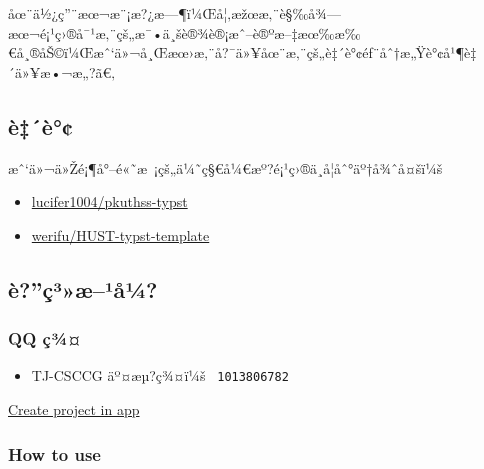 åœ¨ä½¿ç''¨æœ¬æ¨¡æ?¿æ---¶ï¼Œå¦‚æžœæ‚¨è§‰å¾---æœ¬é¡¹ç›®å¯¹æ‚¨çš„æ¯•ä¸šè®¾è®¡æˆ--è®ºæ--‡æœ‰æ‰€å¸®åŠ©ï¼Œæˆ`ä»¬å¸Œæœ›æ‚¨å?¯ä»¥åœ¨æ‚¨çš„è‡´è°¢éƒ¨åˆ†æ„Ÿè°¢å¹¶è‡´ä»¥æ•¬æ„?ã€‚

\subsection{è‡´è°¢}\label{uxe8uxe8}

æˆ`ä»¬ä»Žé¡¶å°--é«˜æ~¡çš„ä¼˜ç§€å¼€æº?é¡¹ç›®ä¸­å­¦åˆ°äº†å¾ˆå¤šï¼š

\begin{itemize}
\tightlist
\item
  \href{https://github.com/lucifer1004/pkuthss-typst}{lucifer1004/pkuthss-typst}
\item
  \href{https://github.com/werifu/HUST-typst-template}{werifu/HUST-typst-template}
\end{itemize}

\subsection{è?''ç³»æ--¹å¼?}\label{uxe8uxe7uxb3uxe6uxb9uxe5uxbc}

\begin{Shaded}
\begin{Highlighting}[]
\NormalTok{[}
    \StringTok{\textquotesingle{}$\textquotesingle{}}\NormalTok{, }\StringTok{\textquotesingle{}\%\textquotesingle{}}\NormalTok{, }\NormalTok{),}
\NormalTok{]}
\end{Highlighting}
\end{Shaded}

\subsubsection{QQ ç¾¤}\label{qq-uxe7uxbe}

\begin{itemize}
\tightlist
\item
  TJ-CSCCG äº¤æµ?ç¾¤ï¼š \texttt{\ 1013806782\ }
\end{itemize}

\href{/app?template=paddling-tongji-thesis&version=0.1.1}{Create project
in app}

\subsubsection{How to use}\label{how-to-use}

